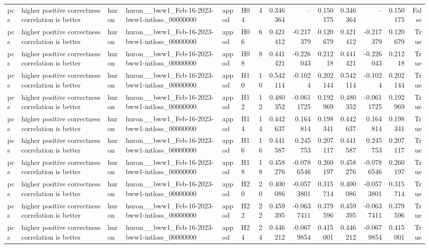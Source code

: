 \begin{longtable}{llllllrrrrrrrr}
pcs & higher positive correctness correlation is better & huron & huron\_\_bww1\_Feb-16-2023-bww1-intloss\_00000000 & appod & H04 & 4 & 0.346364 & -- & 0.150175 & 0.346364 & -- & 0.150175 & False \\
pcs & higher positive correctness correlation is better & huron & huron\_\_bww1\_Feb-16-2023-bww1-intloss\_00000000 & appod & H06 & 6 & 0.421412 & -0.217379 & 0.120679 & 0.421412 & -0.217379 & 0.120679 & True \\
pcs & higher positive correctness correlation is better & huron & huron\_\_bww1\_Feb-16-2023-bww1-intloss\_00000000 & appod & H08 & 8 & 0.441421 & -0.226043 & 0.21218 & 0.441421 & -0.226043 & 0.21218 & True \\
pcs & higher positive correctness correlation is better & huron & huron\_\_bww1\_Feb-16-2023-bww1-intloss\_00000000 & appod & H10 & 10 & 0.542114 & -0.1024 & 0.202144 & 0.542114 & -0.1024 & 0.202144 & True \\
pcs & higher positive correctness correlation is better & huron & huron\_\_bww1\_Feb-16-2023-bww1-intloss\_00000000 & appod & H12 & 12 & 0.480352 & -0.0611725 & 0.192969 & 0.480352 & -0.0611725 & 0.192969 & True \\
pcs & higher positive correctness correlation is better & huron & huron\_\_bww1\_Feb-16-2023-bww1-intloss\_00000000 & appod & H14 & 14 & 0.442637 & 0.164814 & 0.198341 & 0.442637 & 0.164814 & 0.198341 & True \\
pcs & higher positive correctness correlation is better & huron & huron\_\_bww1\_Feb-16-2023-bww1-intloss\_00000000 & appod & H16 & 16 & 0.441587 & 0.245753 & 0.207117 & 0.441587 & 0.245753 & 0.207117 & True \\
pcs & higher positive correctness correlation is better & huron & huron\_\_bww1\_Feb-16-2023-bww1-intloss\_00000000 & appod & H18 & 18 & 0.458276 & -0.0786546 & 0.260197 & 0.458276 & -0.0786546 & 0.260197 & True \\
pcs & higher positive correctness correlation is better & huron & huron\_\_bww1\_Feb-16-2023-bww1-intloss\_00000000 & appod & H20 & 20 & 0.400086 & -0.0573801 & 0.315714 & 0.400086 & -0.0573801 & 0.315714 & True \\
pcs & higher positive correctness correlation is better & huron & huron\_\_bww1\_Feb-16-2023-bww1-intloss\_00000000 & appod & H22 & 22 & 0.459395 & -0.0637411 & 0.379596 & 0.459395 & -0.0637411 & 0.379596 & True \\
pcs & higher positive correctness correlation is better & huron & huron\_\_bww1\_Feb-16-2023-bww1-intloss\_00000000 & appod & H24 & 24 & 0.446212 & -0.0679854 & 0.415001 & 0.446212 & -0.0679854 & 0.415001 & True \\

\end{longtable}
